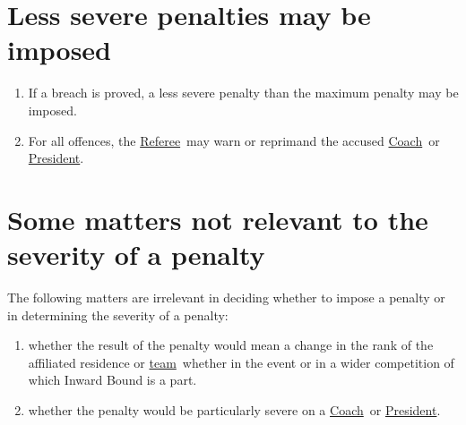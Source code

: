\documentclass[12pt]{report}
\newcommand{\hyplink}[1]{\hyperlink{#1}{{#1}}}
\newcommand{\Captain}{\hyplink{Coach}}
\newcommand{\Coach}{\hyplink{Coach}}\newcommand{\xCaptain}{Coach}
\newcommand\President{\hyplink{President}}\newcommand\xPresident{President}
\newcommand{\Referee}{\hyplink{Referee}}
\newcommand{\team}{\hyplink{team}}
\begin{document}
  \section{Less severe penalties may be imposed}
  \begin{enumerate}
    \item If a breach is proved, a less severe penalty than the maximum penalty may be imposed.
    \item For all offences, the \Referee\ may warn or reprimand the accused \Captain\ or \President.
  \end{enumerate}
  \section{Some matters not relevant to the severity of a penalty}
  \begin{fenumerate}
    \item The following matters are irrelevant in deciding whether to impose a penalty or in determining the severity of a penalty:
    \begin{enumerate}
      \item whether the result of the penalty would mean a change in the rank of the affiliated residence or \team\ whether in the event or in a wider competition of which Inward Bound is a part.
      \item whether the penalty would be particularly severe on a \Coach\ or \President.
    \end{enumerate}
  \end{fenumerate}
\end{document}
